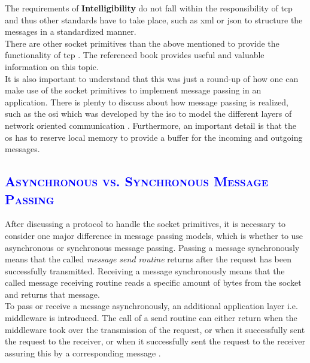 \documentclass[xcolor=dvipsnames]{article}
\begin{document}
\noindent The requirements of \textbf{Intelligibility} do not fall within the responsibility of \gls{tcp} and thus other standards have to take place, such as \gls{xml} or \gls{json} to structure the messages in a standardized manner.\\

\noindent There are other socket primitives than the above mentioned to provide the functionality of \gls{tcp} \cite[ch. 4.3.1 on p. 141]{tanenbaum}. The referenced book \cite{tanenbaum} provides useful and valuable information on this topic.\\

\noindent It is also important to understand that this was just a round-up of how one can make use of the socket primitives to implement message passing in an application. There is plenty to discuss about how message passing is realized, such as the \gls{osi} which was developed by the \gls{iso} to model the different layers of network oriented communication \cite[ch. 4.1.1 on p. 116]{tanenbaum}. Furthermore, an important detail is that the \gls{os} has to reserve local memory to provide a buffer for the incoming and outgoing messages.

\subsection{\scshape{\textcolor{blue}{Asynchronous vs. Synchronous Message Passing}}}

\noindent After discussing a protocol to handle the socket primitives, it is necessary to consider one major difference in message passing models, which is whether to use asynchronous or synchronous message passing. Passing a message synchronously means that the called \textit{message send routine} returns after the request has been successfully transmitted. Receiving a message synchronously means that the called message receiving routine reads a specific amount of bytes from the socket and returns that message.\\

\noindent To pass or receive a message asynchronously, an additional application layer i.e. middleware is introduced. The call of a send routine can either return when the middleware took over the transmission of the request, or when it successfully sent the request to the receiver, or when it successfully sent the request to the receiver assuring this by a corresponding message \cite[ch. 4.1 on p. 125]{tanenbaum}.\\
\end{document}
